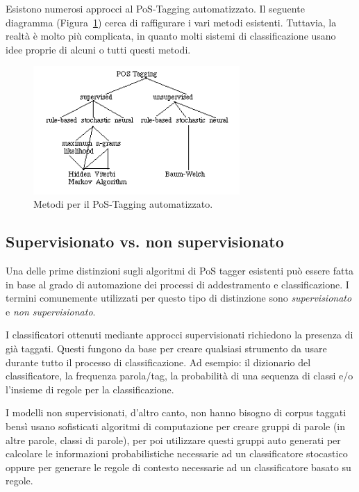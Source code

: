 Esistono numerosi approcci al PoS-Tagging automatizzato.
Il seguente diagramma (Figura~\ref{fig:feedforwardNeuralNetwork}) cerca di
raffigurare i vari metodi esistenti. Tuttavia, la realt\`a \`e molto pi\`u
complicata, in quanto molti sistemi di classificazione usano idee proprie di
alcuni o tutti questi metodi.

\begin{figure}[tp]
  \centering
  \begin{center}
    \includegraphics[width=0.7\textwidth]{./images/tagging_overview.png}
  \end{center}
  \caption{Metodi per il PoS-Tagging automatizzato.}
  \label{fig:feedforwardNeuralNetwork}
\end{figure}

\subsection{Supervisionato vs. non supervisionato}
\nocite{BrillMarcus:1993}
\nocite{Brill:1995}
\nocite{Schutze:1993}

Una delle prime distinzioni sugli algoritmi di PoS tagger esistenti pu\`o essere
fatta in base al grado di automazione dei processi di addestramento e classificazione.
I termini comunemente utilizzati per questo tipo di distinzione sono \emph{supervisionato}
e \emph{non supervisionato}.

I classificatori ottenuti mediante approcci supervisionati richiedono la presenza
di gi\`a taggati. Questi fungono da base per creare qualsiasi strumento da usare
durante tutto il processo di classificazione. Ad esempio: il dizionario del
classificatore, la frequenza parola/tag, la probabilit\`a di una sequenza di
classi e/o l'insieme di regole per la classificazione.

I modelli non supervisionati, d'altro canto, non hanno bisogno di corpus taggati
bens\`i usano sofisticati algoritmi di computazione per creare gruppi di parole
(in altre parole, classi di parole), per poi utilizzare questi gruppi auto generati
per calcolare le informazioni probabilistiche necessarie ad un classificatore
stocastico oppure per generare le regole di contesto necessarie ad un classificatore
basato su regole.

